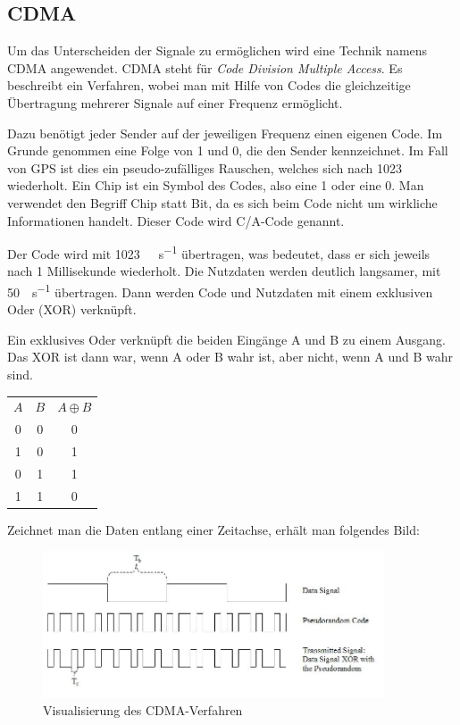 \documentclass[12pt,a4paper]{scrartcl}
\begin{document}
\subsection{CDMA}

Um das Unterscheiden der Signale zu ermöglichen wird eine Technik namens CDMA angewendet.
CDMA steht für \emph{Code Division Multiple Access}. Es beschreibt ein Verfahren, wobei man mit Hilfe von Codes die gleichzeitige Übertragung mehrerer Signale auf einer Frequenz ermöglicht.

Dazu benötigt jeder Sender auf der jeweiligen Frequenz einen eigenen Code. Im Grunde genommen eine Folge von 1 und 0, die den Sender kennzeichnet. Im Fall von GPS ist dies ein pseudo-zufälliges Rauschen, welches sich nach \SI{1023}{\chip} wiederholt. Ein Chip ist ein Symbol des Codes, also eine 1 oder eine 0. Man verwendet den Begriff Chip statt Bit, da es sich beim Code nicht um wirkliche Informationen handelt. Dieser Code wird C/A-Code genannt.

Der Code wird mit \SI{1023}{\mega\chip\per\second} übertragen, was bedeutet, dass er sich jeweils nach 1 Millisekunde wiederholt.
Die Nutzdaten werden deutlich langsamer, mit \SI{50}{\bit\per\second} übertragen. Dann werden Code und Nutzdaten mit einem exklusiven Oder (XOR) verknüpft.

Ein exklusives Oder verknüpft die beiden Eingänge A und B zu einem Ausgang. Das XOR ist dann war, wenn A oder B wahr ist, aber nicht, wenn A und B wahr sind.

\begin{center}
\begin{tabular}{cc|c}
\textbf{$A$} & \textbf{$B$} & \textbf{$A\oplus B$} \\
0 & 0 & 0 \\
1 & 0 & 1 \\
0 & 1 & 1 \\
1 & 1 & 0 \\
\end{tabular}
\end{center}

Zeichnet man die Daten entlang einer Zeitachse, erhält man folgendes Bild:

\begin{figure}[H]
\centering
\includegraphics[width=0.9\textwidth]{img/Generation_of_CDMA.jpg}
\caption{Visualisierung des CDMA-Verfahren\cite{commons_cdma}}
\label{fig:cdma}
\end{figure}
\end{document}
